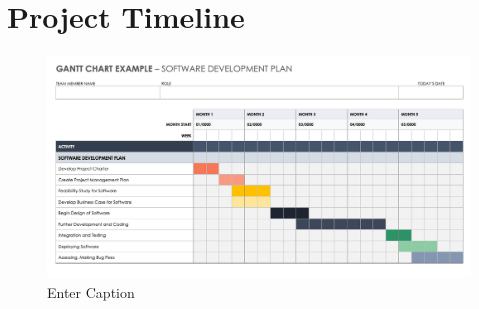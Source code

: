 \section{Project Timeline}
\begin{figure}
    \centering
    \includegraphics[width=1.2\linewidth, angle=90]{IC-Gantt-Chart-.png}
    \caption{Enter Caption}
    \label{fig:enter-label}
\end{figure}
